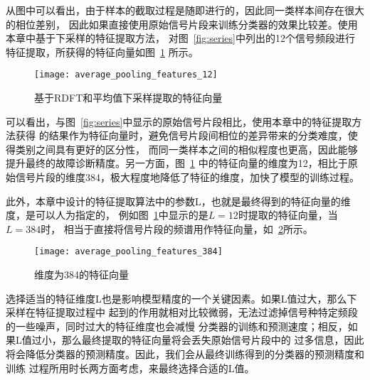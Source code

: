 从图中可以看出，由于样本的截取过程是随即进行的，因此同一类样本间存在很大的相位差别，
因此如果直接使用原始信号片段来训练分类器的效果比较差。使用本章中基于下采样的特征提取方法，
对图~\ref{fig:series}中列出的12个信号频段进行特征提取，所获得的特征向量如图~\ref{fig:average_pooling_features_12}
所示。
\begin{figure}[ht] %
  \centering
  \texttt{[image: average\_pooling\_features\_12]}
  \caption{基于RDFT和平均值下采样提取的特征向量}
  \label{fig:average_pooling_features_12}
\end{figure}

可以看出，与图~\ref{fig:series}中显示的原始信号片段相比，使用本章中的特征提取方法获得
的结果作为特征向量时，避免信号片段间相位的差异带来的分类难度，使得类别之间具有更好的区分性，
而同一类样本之间的相似程度也更高，因此能够提升最终的故障诊断精度。另一方面，图~\ref{fig:average_pooling_features_12}
中的特征向量的维度为12，相比于原始信号片段的维度384，极大程度地降低了特征的维度，加快了模型的训练过程。

此外，本章中设计的特征提取算法中的参数L，也就是最终得到的特征向量的维度，是可以人为指定的，
例如图~\ref{fig:average_pooling_features_12}中显示的是$L=12$时提取的特征向量，当$L=384$时，
相当于直接将信号片段的频谱用作特征向量，如~\ref{fig:average_pooling_features_384}所示。
\begin{figure}[ht] %
  \centering
  \texttt{[image: average\_pooling\_features\_384]}
  \caption{维度为384的特征向量}
  \label{fig:average_pooling_features_384}
\end{figure}

选择适当的特征维度L也是影响模型精度的一个关键因素。如果L值过大，那么下采样在特征提取过程中
起到的作用就相对比较微弱，无法过滤掉信号种特定频段的一些噪声，同时过大的特征维度也会减慢
分类器的训练和预测速度；相反，如果L值过小，那么最终提取的特征向量将会丢失原始信号片段中的
过多信息，因此将会降低分类器的预测精度。因此，我们会从最终训练得到的分类器的预测精度和训练
过程所用时长两方面考虑，来最终选择合适的L值。

